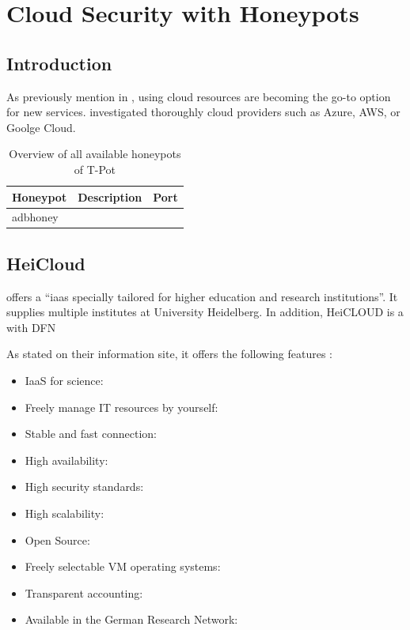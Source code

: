 \chapter{Cloud Security with Honeypots}

\section{Introduction}


As previously mention in , using cloud resources are becoming the go-to option for new services.
\citet{Kelly2021} investigated thoroughly cloud providers such as Azure, AWS, or Goolge Cloud. 


\begin{table}[h]
    \centering
    \caption{Overview of all available honeypots of T-Pot}
    \begin{tabularx}{\linewidth}{l|l|l}
        \toprule
        \textbf{Honeypot}                                 & \textbf{Description} & \textbf{Port} \\
        \hline
        adbhoney                                 &             &      \\
        \bottomrule
    \end{tabularx}
    \label{tab:overview-cloud-security}
\end{table}

\section{HeiCloud}

\citet{urz2021} offers a \enquote{\ac{iaas} specially tailored for higher education and research institutions}.
It supplies multiple institutes at University Heidelberg.
In addition, HeiCLOUD is a with DFN 

As stated on their information site, it offers the following features \cite{heicloud2021}:

\begin{itemize}
    \item IaaS for science:
    \item Freely manage IT resources by yourself:
    \item Stable and fast connection:
    \item High availability:
    \item High security standards:
    \item High scalability:
    \item Open Source:
    \item Freely selectable VM operating systems:
    \item Transparent accounting:
    \item Available in the German Research Network:
\end{itemize}

